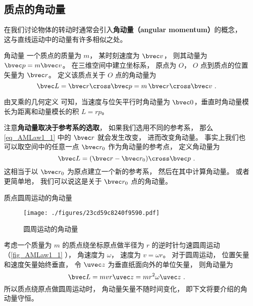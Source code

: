 

\subsection{质点的角动量}
在我们讨论物体的转动时通常会引入\textbf{角动量（angular momentum）}的概念， 这与直线运动中的动量有许多相似之处。

\begin{definition}{角动量}
一个质点的质量为 $m$， 某时刻速度为 $\bvec v$， 则其动量为 $\bvec p = m\bvec v$。 在三维空间中建立坐标系， 原点为 $O$， $O$ 点到质点的位置矢量为 $\bvec r$。 定义该质点关于 $O$ 点的角动量为
\begin{equation}\label{eq_AMLaw1_1}
\bvec L = \bvec r \cross \bvec p = m \,\bvec r\cross \bvec v~.
\end{equation}
\end{definition}

由叉乘的几何定义 可知，当速度与位矢平行时角动量为 $\bvec 0$，垂直时角动量模长为距离和动量模长的积 $L = rp$。

注意\textbf{角动量取决于参考系的选取}， 如果我们选用不同的参考系， 那么\autoref{eq_AMLaw1_1} 中的 $\bvec r$ 就会发生改变， 进而改变角动量。 事实上我们也可以取空间中的任意一点 $\bvec r_0$ 作为角动量的参考点， 定义角动量为
\begin{equation}
\bvec L = (\bvec r - \bvec r_0) \cross \bvec p~.
\end{equation}
这相当于以 $\bvec r_0$ 为原点建立一个新的参考系， 然后在其中计算角动量。 或者更简单地， 我们可以说这是关于 $\bvec r_0$ 点的角动量。

\begin{example}{质点圆周运动的角动量}\label{ex_AMLaw1_2}
\begin{figure}[ht]
\centering
\texttt{[image: ./figures/23cd59c8240f9590.pdf]}
\caption{圆周运动的角动量} \label{fig_AMLaw1_1}
\end{figure}
考虑一个质量为 $m$ 的质点绕坐标原点做半径为 $r$ 的逆时针匀速圆周运动（\autoref{fig_AMLaw1_1} ）， 角速度为 $\omega$， 速度为 $v = \omega r$。 对于圆周运动， 位置矢量和速度矢量始终垂直， 令 $\uvec z$ 为垂直纸面向外的单位矢量， 则角动量为
\begin{equation}
\bvec L = mvr \uvec z = m r^2 \omega \uvec z~.
\end{equation}
所以质点绕原点做圆周运动时， 角动量矢量不随时间变化， 即下文将要介绍的角动量守恒。
\end{example}

